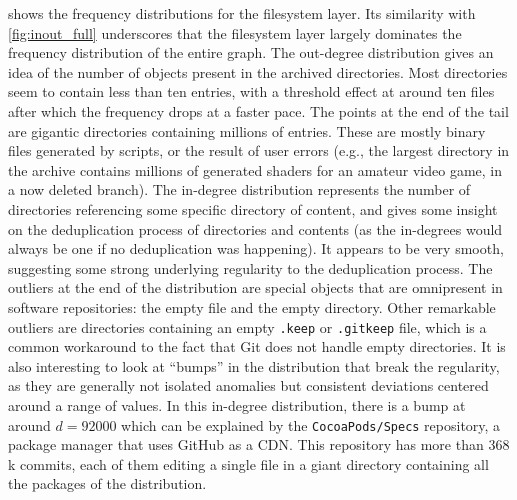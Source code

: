  shows the frequency distributions for the filesystem
layer. Its similarity with \cref{fig:inout_full} underscores that the
filesystem layer largely dominates the frequency distribution of the entire
graph.
The out-degree distribution gives an idea of the number of objects present in
the archived directories. Most directories seem to contain less than ten
entries, with a threshold effect at around ten files after which the frequency
drops at a faster pace. The points at the end of the tail are gigantic
directories containing millions of entries. These are mostly binary files
generated by scripts, or the result of user errors (e.g., the largest directory
in the archive contains millions of generated shaders for an amateur video
game, in a now deleted branch).
The in-degree distribution represents the number of directories referencing some
specific directory of content, and gives some insight on the deduplication
process of directories and contents (as the in-degrees would always be one if no
deduplication was happening). It appears to be very smooth, suggesting some
strong underlying regularity to the deduplication process.
The outliers at the end of the distribution are special objects that are
omnipresent in software repositories: the empty file and the empty directory.
Other remarkable outliers are directories containing an empty \texttt{.keep}
or \texttt{.gitkeep} file, which is a common workaround to the fact that Git
does not handle empty directories.
It is also interesting to look at ``bumps'' in the distribution that break the
regularity, as they are generally not isolated anomalies but consistent
deviations centered around a range of values. In this in-degree distribution,
there is a bump at around $d = \num{92 000}$ which can be explained by the
\texttt{CocoaPods/Specs} repository, a package manager that uses GitHub as a
\gls{CDN}. This repository has more than 368 k commits, each of them editing a
single file in a giant directory containing all the packages of the
distribution.

